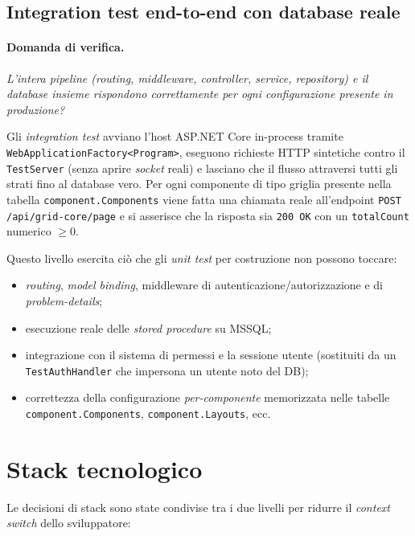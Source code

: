 \subsection{Integration test end-to-end con database reale}

\paragraph{Domanda di verifica.} \emph{L'intera pipeline (routing, middleware, controller, service, repository) e il database insieme rispondono correttamente per ogni configurazione presente in produzione?}

Gli \emph{integration test} avviano l'host ASP.NET Core in-process tramite \texttt{WebApplicationFactory<Program>}, eseguono richieste HTTP sintetiche contro il \texttt{TestServer} (senza aprire \emph{socket} reali) e lasciano che il flusso attraversi tutti gli strati fino al database vero. Per ogni componente di tipo griglia presente nella tabella \texttt{component.Components} viene fatta una chiamata reale all'endpoint \texttt{POST /api/grid-core/page} e si asserisce che la risposta sia \texttt{200 OK} con un \texttt{totalCount} numerico $\ge 0$.

Questo livello esercita ciò che gli \emph{unit test} per costruzione non possono toccare:
\begin{itemize}
    \item \emph{routing}, \emph{model binding}, middleware di autenticazione/autorizzazione e di \emph{problem-details};
    \item esecuzione reale delle \emph{stored procedure} su MSSQL;
    \item integrazione con il sistema di permessi e la sessione utente (sostituiti da un \texttt{TestAuthHandler} che impersona un utente noto del DB);
    \item correttezza della configurazione \emph{per-componente} memorizzata nelle tabelle \texttt{component.Components}, \texttt{component.Layouts}, ecc.
\end{itemize}

\section{Stack tecnologico}

Le decisioni di stack sono state condivise tra i due livelli per ridurre il \emph{context switch} dello sviluppatore:

